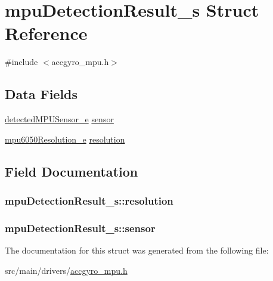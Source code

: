 \hypertarget{structmpuDetectionResult__s}{\section{mpu\+Detection\+Result\+\_\+s Struct Reference}
\label{structmpuDetectionResult__s}
}


{\ttfamily \#include $<$accgyro\+\_\+mpu.\+h$>$}

\subsection*{Data Fields}
\begin{DoxyCompactItemize}
\item 
\hyperlink{accgyro__mpu_8h_a8501105c2819b786dc1041bb3577d79a}{detected\+M\+P\+U\+Sensor\+\_\+e} \hyperlink{structmpuDetectionResult__s_a0555055d1b8502fcd76b7d614fa411fb}{sensor}
\item 
\hyperlink{accgyro__mpu_8h_a7a4f34e74e80dc3d4fb4f8de2514853b}{mpu6050\+Resolution\+\_\+e} \hyperlink{structmpuDetectionResult__s_ae993d67ba2fdbcbebbbd9c985be22cad}{resolution}
\end{DoxyCompactItemize}


\subsection{Field Documentation}
\hypertarget{structmpuDetectionResult__s_ae993d67ba2fdbcbebbbd9c985be22cad}{
\subsubsection[{resolution}]{ mpu\+Detection\+Result\+\_\+s\+::resolution}}\label{structmpuDetectionResult__s_ae993d67ba2fdbcbebbbd9c985be22cad}
\hypertarget{structmpuDetectionResult__s_a0555055d1b8502fcd76b7d614fa411fb}{
\subsubsection[{sensor}]{ mpu\+Detection\+Result\+\_\+s\+::sensor}}\label{structmpuDetectionResult__s_a0555055d1b8502fcd76b7d614fa411fb}


The documentation for this struct was generated from the following file\+:\begin{DoxyCompactItemize}
\item 
src/main/drivers/\hyperlink{accgyro__mpu_8h}{accgyro\+\_\+mpu.\+h}\end{DoxyCompactItemize}
